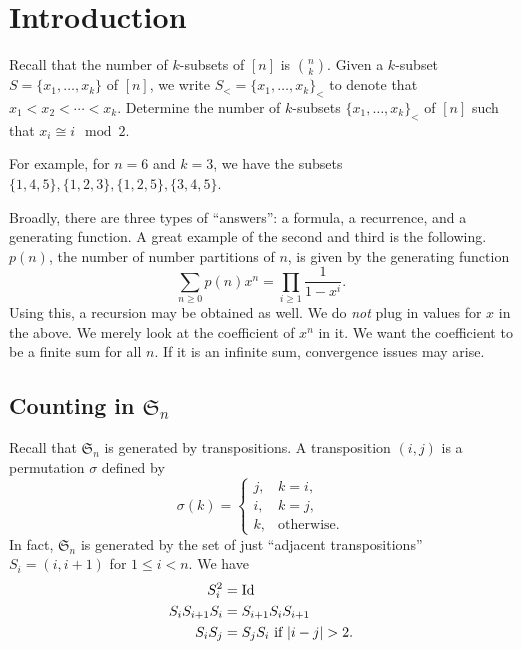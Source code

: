\section{Introduction}

\begin{exercise}
	Recall that the number of $k$-subsets of $[n]$ is $\binom{n}{k}$. Given a $k$-subset $S = \{x_1,\ldots,x_k\}$ of $[n]$, we write $S_< = \{x_1,\ldots,x_k\}_<$ to denote that $x_1<x_2<\cdots<x_k$. Determine the number of $k$-subsets $\{x_1,\ldots,x_k\}_<$ of $[n]$ such that $x_i \cong i \mod 2$.
\end{exercise}
For example, for $n=6$ and $k=3$, we have the subsets $\{1,4,5\},\{1,2,3\},\{1,2,5\},\{3,4,5\}$.


Broadly, there are three types of ``answers'': a formula, a recurrence, and a generating function. A great example of the second and third is the following.\\
$p(n)$, the number of number partitions of $n$, is given by the generating function
\[ \sum_{n \ge 0} p(n) x^n = \prod_{i \ge 1} \frac{1}{1-x^i}. \]
Using this, a recursion may be obtained as well.
We do \emph{not} plug in values for $x$ in the above. We merely look at the coefficient of $x^n$ in it. We want the coefficient to be a finite sum for all $n$. If it is an infinite sum, convergence issues may arise.



\subsection{Counting in \texorpdfstring{$\mathfrak{S}_n$}{Sn}}

	Recall that $\mathfrak{S}_n$ is generated by transpositions. A transposition $(i,j)$ is a permutation $\sigma$ defined by
	\[ \sigma(k) = \begin{cases} j, & k=i, \\ i, & k=j, \\ k, & \text{otherwise.} \end{cases} \]
	In fact, $\mathfrak{S}_n$ is generated by the set of just ``adjacent transpositions'' $S_i = (i,i+1)$ for $1 \le i < n$.
	We have
	\begin{align*}
		S_i^2 &= \operatorname{Id} \\
		S_i S_{i+1} S_i &= S_{i+1} S_i S_{i+1} \\
		S_i S_j &= S_j S_i \text{ if $|i-j| > 2$.}
	\end{align*}


